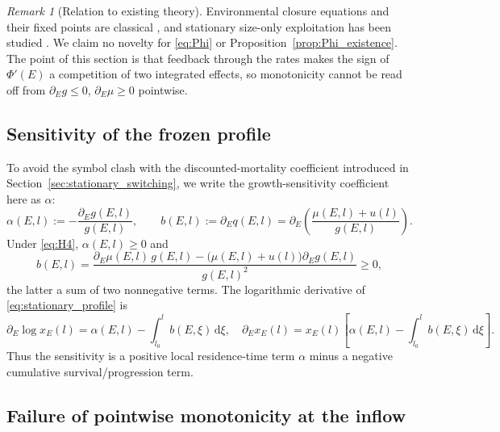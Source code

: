 \documentclass[pdflatex,sn-mathphys-num]{sn-jnl}
\newcommand{\dd}{\,\mathrm{d}}
\theoremstyle{plain}
\theoremstyle{definition}
\theoremstyle{remark}
\newtheorem{remark}[theorem]{Remark}
\begin{document}
\begin{remark}[Relation to existing theory]
\label{rmk:stationary_novelty}
Environmental closure equations and their fixed points are classical
\cite{metz2014dynamics,diekmann2003steady,gyllenberg2007mathematical}, and stationary
size-only exploitation has been studied \cite{davydov2011optimization}. We claim no
novelty for \eqref{eq:Phi} or Proposition~\ref{prop:Phi_existence}. The point of
this section is that feedback through the rates makes the sign of $\Phi'(E)$ a
competition of two integrated effects, so monotonicity cannot be read off from
$\partial_Eg\le0$, $\partial_E\mu\ge0$ pointwise.
\end{remark}

\subsection{Sensitivity of the frozen profile}
\label{subsec:profile_sensitivity}

To avoid the symbol clash with the discounted-mortality coefficient introduced in
Section~\ref{sec:stationary_switching}, we write the growth-sensitivity coefficient
here as $\alpha$:
\begin{equation}\label{eq:a_b_definitions}
\alpha(E,l):=-\frac{\partial_Eg(E,l)}{g(E,l)},
\qquad
b(E,l):=\partial_Eq(E,l)
=\partial_E\!\left(\frac{\mu(E,l)+u(l)}{g(E,l)}\right).
\end{equation}
Under \eqref{eq:H4}, $\alpha(E,l)\ge0$ and
\begin{equation}\label{eq:b_expansion}
b(E,l)
=
\frac{\partial_E\mu(E,l)\,g(E,l)-\big(\mu(E,l)+u(l)\big)\partial_Eg(E,l)}{g(E,l)^2}
\ge0,
\end{equation}
the latter a sum of two nonnegative terms. The logarithmic derivative of
\eqref{eq:stationary_profile} is
\begin{equation}\label{eq:dE_log_x}
\partial_E\log x_E(l)
=
\alpha(E,l)-\int_{l_0}^{l}b(E,\xi)\dd\xi,
\quad
\partial_Ex_E(l)
=
x_E(l)\left[\alpha(E,l)-\int_{l_0}^{l}b(E,\xi)\dd\xi\right].
\end{equation}
Thus the sensitivity is a positive local residence-time term $\alpha$ minus a
negative cumulative survival/progression term.

\subsection{Failure of pointwise monotonicity at the inflow}
\label{subsec:pointwise_failure}
\end{document}
